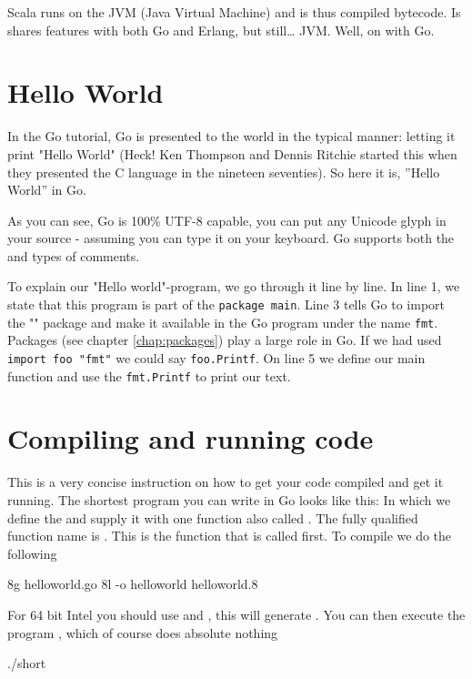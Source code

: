 Scala runs on the JVM (Java Virtual Machine) and is thus compiled 
bytecode. Is shares features with both Go and Erlang, but still\ldots
JVM.  Well, on with Go.


\section{Hello World}
\label{sec:hello world}
In the Go tutorial, Go is presented to the world in the typical
manner: letting it print "Hello World" (Heck! Ken Thompson and
Dennis Ritchie started this when they presented the C language in 
the nineteen seventies).
So here it is, ''Hello World'' in Go.


As you can see, Go is 100\% UTF-8 capable, you can put any Unicode
glyph in your source - assuming you can type it on your keyboard.
Go supports both the \texttt{\rem{/* */}} and \texttt{\rem{//}} types of comments. 

To explain our "Hello
world"-program, we go through it line by line. In line 1, we state
that this program is part of the \lstinline{package main}. Line 3
tells Go to import the "" package and make it available
in the Go program under the name \lstinline{fmt}. Packages (see chapter
\ref{chap:packages}) play a large role in Go.
If we had used
\lstinline{import foo "fmt"} we could say \lstinline{foo.Printf}. On
line 5 we define our main function and use the \lstinline{fmt.Printf} to
print our text.

\section{Compiling and running code}
This is a very concise instruction on how to get your code
compiled and get it running.
The shortest program you can write in Go looks like
this:
In which we define the   and supply it with one
function also called . The fully qualified function
name is . This is the function that is called
first.  To compile we do the following
\begin{display}
\pr 8g helloworld.go \qquad\qquad\qquad{}
\pr 8l -o helloworld helloworld.8 \qquad{}
\end{display}
For 64 bit Intel you should use  and , this will
generate .
You can then execute the program , which of course
does absolute nothing
\begin{display}
\pr ./short
\end{display}

